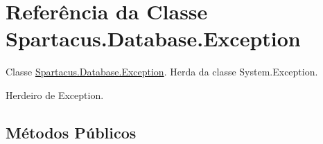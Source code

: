 \hypertarget{classSpartacus_1_1Database_1_1Exception}{\section{Referência da Classe Spartacus.\+Database.\+Exception}
\label{classSpartacus_1_1Database_1_1Exception}
}


Classe \hyperlink{classSpartacus_1_1Database_1_1Exception}{Spartacus.\+Database.\+Exception}. Herda da classe System.\+Exception.  




Herdeiro de Exception.

\subsection*{Métodos Públicos}
